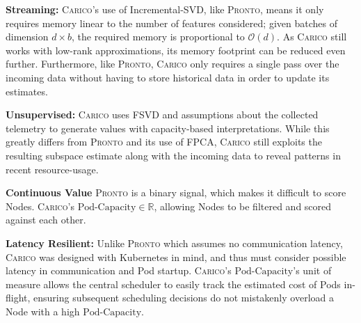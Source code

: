 \textbf{Streaming:} \textsc{Carico}'s use of Incremental-SVD, like
\textsc{Pronto}, means it only requires memory linear to the number of features
considered; given batches of dimension $d \times b$, the required memory is
proportional to $\mathcal{O}(d)$. As \textsc{Carico} still works with low-rank
approximations, its memory footprint can be reduced even further. Furthermore,
like \textsc{Pronto}, \textsc{Carico} only requires a single pass over the
incoming data without having to store historical data in order to update its
estimates.

\textbf{Unsupervised:} \textsc{Carico} uses FSVD and assumptions about the
collected telemetry to generate values with capacity-based interpretations.
While this greatly differs from \textsc{Pronto} and its use of FPCA,
\textsc{Carico} still exploits the resulting subspace estimate along with the
incoming data to reveal patterns in recent resource-usage.

\textbf{Continuous Value} \textsc{Pronto} is a binary signal, which makes it
difficult to score Nodes. \textsc{Carico}'s $\text{Pod-Capacity} \in
\mathbb{R}$, allowing Nodes to be filtered and scored against each other.

\textbf{Latency Resilient:} Unlike \textsc{Pronto} which assumes no communication
latency, \textsc{Carico} was designed with Kubernetes in mind, and thus must consider
possible latency in communication and Pod startup. \textsc{Carico}'s
$\text{Pod-Capacity}$'s unit of measure allows the central scheduler to easily
track the estimated cost of Pods in-flight, ensuring subsequent scheduling
decisions do not mistakenly overload a Node with a high $\text{Pod-Capacity}$.
%
%
%
%
